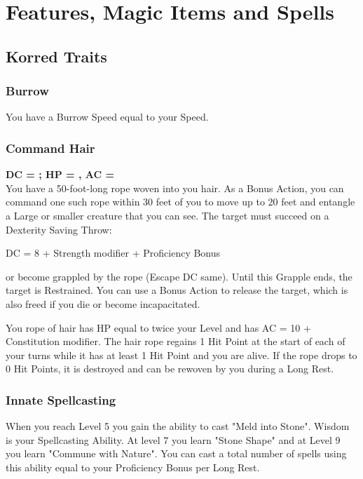 \documentclass[letterpaper,openany,oneside,twocolumn]{book}
\begin{document}
\onecolumn


\rendercharactersheet

\renderbackgroundsheet

\renderspellsheet



\restoregeometry
\twocolumn

\chapter*{Features, Magic Items and Spells}

\section*{Korred Traits}
\subsection*{Burrow}
You have a Burrow Speed equal to your Speed.
\subsection*{Command Hair}
\textbf{DC = ; HP = , AC = }\\
You have a 50-foot-long rope woven into you hair. As a Bonus Action, you can command one such rope within 30 feet of you to move up to 20 feet and entangle a Large or smaller creature that you can see. The target must succeed on a Dexterity Saving Throw:
\begin{center}
	DC = 8 + Strength modifier + Proficiency Bonus
\end{center}
or become grappled by the rope (Escape DC same). Until this Grapple ends, the target is Restrained. You can use a Bonus Action to release the target, which is also freed if you die or become incapacitated.

You rope of hair has HP equal to twice your Level and has AC = 10 + Constitution modifier. The hair rope regains 1 Hit Point at the start of each of your turns while it has at least 1 Hit Point and you are alive. If the rope drops to 0 Hit Points, it is destroyed and can be rewoven by you during a Long Rest.
\subsection*{Innate Spellcasting}
When you reach Level 5 you gain the ability to cast "Meld into Stone". Wisdom is your Spellcasting Ability. At level 7 you learn "Stone Shape" and at Level 9 you learn "Commune with Nature". You can cast a total number of spells using this ability equal to your Proficiency Bonus per Long Rest.
\end{document}
